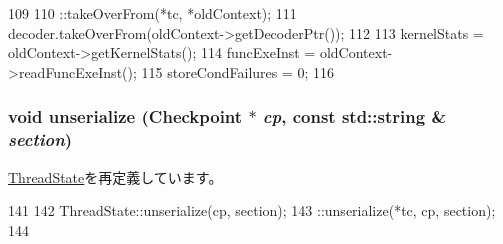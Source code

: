 \begin{DoxyCode}
109 {
110     ::takeOverFrom(*tc, *oldContext);
111     decoder.takeOverFrom(oldContext->getDecoderPtr());
112 
113     kernelStats = oldContext->getKernelStats();
114     funcExeInst = oldContext->readFuncExeInst();
115     storeCondFailures = 0;
116 }
\end{DoxyCode}
\hypertarget{classSimpleThread_af22e5d6d660b97db37003ac61ac4ee49}{
\subsubsection[{unserialize}]{\setlength{\rightskip}{0pt plus 5cm}void unserialize ({\bf Checkpoint} $\ast$ {\em cp}, \/  const std::string \& {\em section})}}
\label{classSimpleThread_af22e5d6d660b97db37003ac61ac4ee49}


\hyperlink{structThreadState_af22e5d6d660b97db37003ac61ac4ee49}{ThreadState}を再定義しています。


\begin{DoxyCode}
141 {
142     ThreadState::unserialize(cp, section);
143     ::unserialize(*tc, cp, section);
144 }
\end{DoxyCode}


